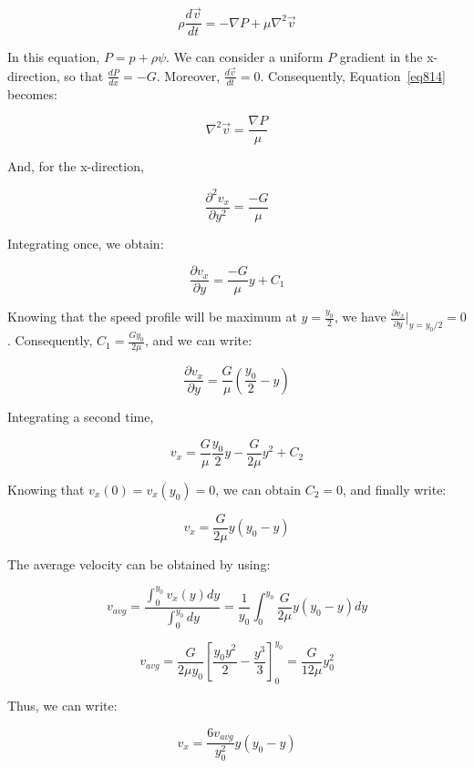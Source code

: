 \begin{equation}\label{eq814}
\rho \frac{d \vec{v}}{dt} = - \nabla P + \mu \nabla^2 \vec{v}
\end{equation}

In this equation, $P = p + \rho \psi$. We can consider a uniform $P$ gradient in the x-direction, so that $\frac{dP}{dx} = -G$. Moreover, $\frac{d \vec{v}}{dt} = 0$. Consequently, Equation~\ref{eq814} becomes:

\begin{equation}\label{eq815}
\nabla^2 \vec{v} = \frac{\nabla P}{\mu}
\end{equation}

And, for the x-direction,


\begin{equation}\label{eq816}
\frac{\partial^2 v_x}{\partial y^2} = \frac{-G}{\mu}
\end{equation}

Integrating once, we obtain:

\begin{equation}\label{eq817}
\frac{\partial v_x}{\partial y} = \frac{-G}{\mu}y + C_1
\end{equation}

Knowing that the speed profile will be maximum at $y=\frac{y_0}{2}$, we have $\frac{\partial v_x}{\partial y} \bigg\rvert_{y=y_0/2} = 0$. Consequently, $C_1 = \frac{Gy_0}{2\mu}$, and we can write:

\begin{equation}\label{eq818}
\frac{\partial v_x}{\partial y} = \frac{G}{\mu} \left( \frac{y_0}{2} - y \right)
\end{equation}

Integrating a second time,

\begin{equation}\label{eq819}
v_x = \frac{G}{\mu}\frac{y_0}{2}y - \frac{G}{2\mu}y^2 + C_2
\end{equation}

Knowing that $v_x(0) = v_x(y_0) = 0$, we can obtain $C_2 = 0$, and finally write:

\begin{equation}\label{eq820}
v_x = \frac{G}{2\mu}y(y_0 - y)
\end{equation}

The average velocity can be obtained by using:

\begin{equation}\label{eq821}
v_{avg} = \frac{\int_0^{y_0} v_x(y) dy}{\int_0^{y_0} dy} = \frac{1}{y_0} \int_0^{y_0} \frac{G}{2\mu}y(y_0 - y) dy
\end{equation}

\begin{equation}\label{eq822}
v_{avg} = \frac{G}{2\mu y_0} \left[ \frac{y_0y^2}{2} - \frac{y^3}{3} \right]_0^{y_0} = \frac{G}{12\mu} y_0^2
\end{equation}

Thus, we can write:

\begin{equation}\label{eq823}
v_x = \frac{6v_{avg}}{y_0^2}y(y_0 - y)
\end{equation}

